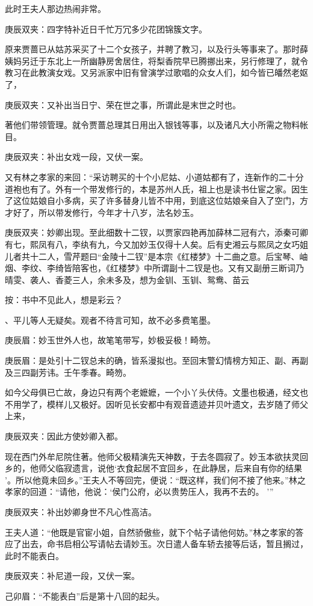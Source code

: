 \begin{parag}
    此时王夫人那边热闹非常。\begin{note}庚辰双夹：四字特补近日千忙万冗多少花团锦簇文字。\end{note}原来贾蔷已从姑苏采买了十二个女孩子，并聘了教习，以及行头等事来了。那时薛姨妈另迁于东北上一所幽静房舍居住，将梨香院早已腾挪出来，另行修理了，就令教习在此教演女戏。又另派家中旧有曾演学过歌唱的众女人们，如今皆已皤然老妪了，\begin{note}庚辰双夹：又补出当日宁、荣在世之事，所谓此是末世之时也。\end{note}著他们带领管理。就令贾蔷总理其日用出入银钱等事，以及诸凡大小所需之物料帐目。\begin{note}庚辰双夹：补出女戏一段，又伏一案。\end{note}又有林之孝家的来回：“采访聘买的十个小尼姑、小道姑都有了，连新作的二十分道袍也有了。外有一个带发修行的，本是苏州人氏，祖上也是读书仕宦之家。因生了这位姑娘自小多病，买了许多替身儿皆不中用，到底这位姑娘亲自入了空门，方才好了，所以带发修行，今年才十八岁，法名妙玉。\begin{note}庚辰双夹：妙卿出现。至此细数十二钗，以贾家四艳再加薛林二冠有六，添秦可卿有七，熙凤有八，李纨有九，今又加妙玉仅得十人矣。后有史湘云与熙凤之女巧姐儿者共十二人，雪芹题曰“金陵十二钗”是本宗《红楼梦》十二曲之意。后宝琴、岫烟、李纹、李绮皆陪客也，《红楼梦》中所谓副十二钗是也。又有又副册三断词乃晴雯、袭人、香菱三人，余未多及，想为金钏、玉钏、鸳鸯、苗云\begin{subnote}按：书中不见此人，想是彩云？\end{subnote}、平儿等人无疑矣。观者不待言可知，故不必多费笔墨。\end{note}\begin{note}庚辰眉：妙玉世外人也，故笔笔带写，妙极妥极！畸笏。\end{note}\begin{note}庚辰眉：是处引十二钗总未的确，皆系漫拟也。至回末警幻情榜方知正、副、再副及三四副芳讳。壬午季春。畸笏。\end{note}如今父母俱已亡故，身边只有两个老嬷嬷，一个小丫头伏侍。文墨也极通，经文也不用学了，模样儿又极好。因听见长安都中有观音遗迹并贝叶遗文，去岁随了师父上来，\begin{note}庚辰双夹：因此方使妙卿入都。\end{note}现在西门外牟尼院住著。他师父极精演先天神数，于去冬圆寂了。妙玉本欲扶灵回乡的，他师父临寂遗言，说他‘衣食起居不宜回乡，在此静居，后来自有你的结果 ’。所以他竟未回乡。”王夫人不等回完，便说：“既这样，我们何不接了他来。”林之孝家的回道：“请他，他说：‘侯门公府，必以贵势压人，我再不去的。 ’”\begin{note}庚辰双夹：补出妙卿身世不凡心性高洁。\end{note}王夫人道：“他既是官宦小姐，自然骄傲些，就下个帖子请他何妨。”林之孝家的答应了出去，命书启相公写请帖去请妙玉。次日遣人备车轿去接等后话，暂且搁过，此时不能表白。\begin{note}庚辰双夹：补尼道一段，又伏一案。\end{note}\begin{note}己卯眉：“不能表白”后是第十八回的起头。\end{note}
\end{parag}


